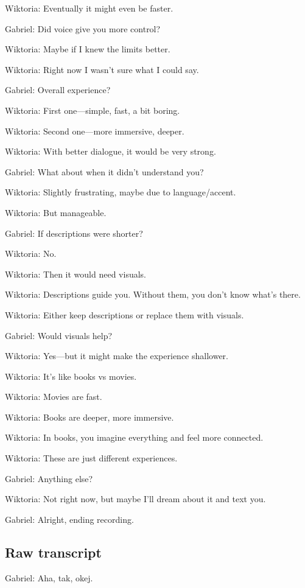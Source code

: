 Wiktoria: Eventually it might even be faster.

Gabriel: Did voice give you more control?

Wiktoria: Maybe if I knew the limits better.

Wiktoria: Right now I wasn’t sure what I could say.

Gabriel: Overall experience?

Wiktoria: First one—simple, fast, a bit boring.

Wiktoria: Second one—more immersive, deeper.

Wiktoria: With better dialogue, it would be very strong.

Gabriel: What about when it didn’t understand you?

Wiktoria: Slightly frustrating, maybe due to language/accent.

Wiktoria: But manageable.

Gabriel: If descriptions were shorter?

Wiktoria: No.

Wiktoria: Then it would need visuals.

Wiktoria: Descriptions guide you. Without them, you don’t know what’s there.

Wiktoria: Either keep descriptions or replace them with visuals.

Gabriel: Would visuals help?

Wiktoria: Yes—but it might make the experience shallower.

Wiktoria: It’s like books vs movies.

Wiktoria: Movies are fast.

Wiktoria: Books are deeper, more immersive.

Wiktoria: In books, you imagine everything and feel more connected.

Wiktoria: These are just different experiences.

Gabriel: Anything else?

Wiktoria: Not right now, but maybe I’ll dream about it and text you.

Gabriel: Alright, ending recording.





\subsection{Raw transcript}

Gabriel: Aha, tak, okej.

